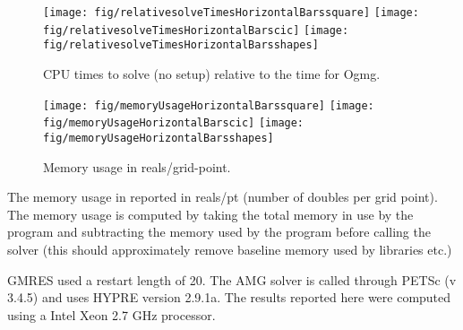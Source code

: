\begin{figure}[hbt]
\begin{center}
  \texttt{[image: fig/relativesolveTimesHorizontalBarssquare]}
  \texttt{[image: fig/relativesolveTimesHorizontalBarscic]}
  \texttt{[image: fig/relativesolveTimesHorizontalBarsshapes]}
  \end{center} 
\caption{CPU times to solve (no setup) relative to the time for Ogmg.}
\label{fig:relativeSolveTimes}
\end{figure}

\begin{figure}[hbt]
\begin{center}
  \texttt{[image: fig/memoryUsageHorizontalBarssquare]}
  \texttt{[image: fig/memoryUsageHorizontalBarscic]}
  \texttt{[image: fig/memoryUsageHorizontalBarsshapes]}
  \end{center} 
\caption{Memory usage in reals/grid-point.}
\label{fig:memoryUsage}
\end{figure}


\medskip\noindent
The memory usage in reported in reals/pt (number of doubles per grid point). The memory usage
is computed by taking the total memory in use by the program and subtracting the memory used
by the program before calling the solver (this should approximately remove baseline memory used by libraries etc.)

\medskip\noindent
GMRES used a restart length of 20.
The AMG solver is called through PETSc (v 3.4.5) and uses HYPRE version 2.9.1a. 
The results reported here were computed using a Intel Xeon 2.7 GHz processor.


